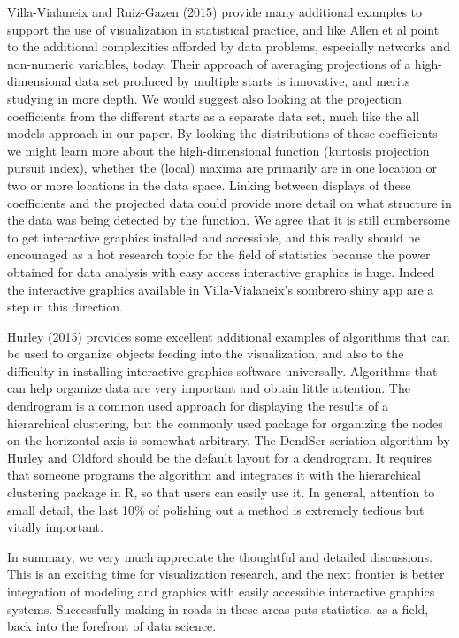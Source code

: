 \documentclass[preprint]{imsart}
\begin{document}
Villa-Vialaneix and Ruiz-Gazen (2015) provide many additional examples to support the use of visualization in statistical practice, and like Allen et al point to the additional complexities afforded by data problems, especially networks and non-numeric variables, today. Their approach of averaging projections of a high-dimensional data set produced by multiple starts is innovative, and merits studying in more depth. We would suggest also looking at the projection coefficients from the different starts as a separate data set, much like the all models approach in our paper. By looking the distributions of these coefficients we might learn more about the high-dimensional function (kurtosis projection pursuit index), whether the (local) maxima are primarily are in one location or two or more locations in the data space. Linking between displays of these coefficients and the projected data could provide more detail on what structure in the data was being detected by the function. We agree that it is still cumbersome to get interactive graphics installed and accessible, and this really should be encouraged as a hot research topic for the field of statistics because the power obtained  for data analysis with easy access interactive graphics is huge. Indeed the interactive graphics available in Villa-Vialaneix's sombrero shiny app are a step in this direction.

Hurley (2015) provides some excellent additional examples of algorithms that can be used to organize objects feeding into the visualization, and also to the difficulty in installing interactive graphics software universally. Algorithms that can help organize data are very important and obtain little attention. The dendrogram is a common used approach for displaying the results of a hierarchical clustering, but the commonly used package for organizing the nodes on the horizontal axis is somewhat arbitrary. The DendSer seriation algorithm by Hurley and Oldford should be the default layout for a dendrogram. It requires that someone programs the algorithm and integrates it with the hierarchical clustering package in R, so that users can easily use it. In general, attention to small detail, the last 10\% of polishing out a method is extremely tedious but vitally important.

In summary, we very much appreciate the thoughtful and detailed discussions. This is an exciting time for visualization research, and the next frontier is better integration of modeling and graphics with easily accessible interactive graphics systems. Successfully making in-roads in these areas puts statistics, as a field, back into the forefront of data science.



\end{document}
